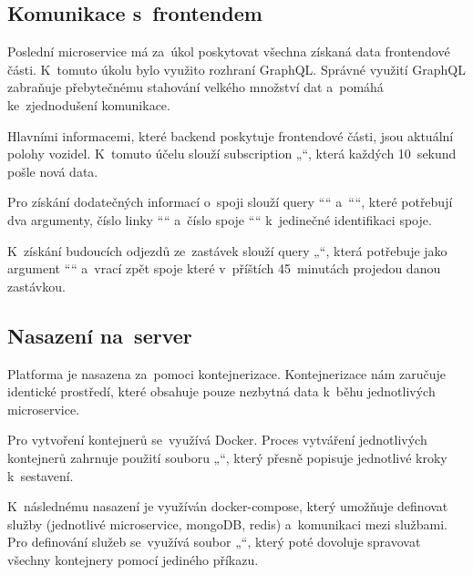 \subsection {Komunikace s~frontendem}\label{mainBackend}
Poslední microservice má za~úkol poskytovat všechna získaná data frontendové části. K~tomuto úkolu bylo využito rozhraní GraphQL. Správné využití GraphQL zabraňuje přebytečnému stahování velkého množství dat a~pomáhá ke~zjednodušení komunikace. \cite{graphqleasy} \par
Hlavními informacemi, které backend poskytuje frontendové části, jsou aktuální polohy vozidel. K~tomuto účelu slouží subscription „“, která každých 10~sekund pošle nová data.\par
Pro získání dodatečných informací o~spoji slouží query ““ \newline a~““, které potřebují dva argumenty, číslo linky ““ \newline a~číslo spoje ““ k~jedinečné identifikaci spoje.\par
K~získání budoucích odjezdů ze~zastávek slouží query „“, která potřebuje jako argument ““ a~vrací zpět spoje které v~příštích 45~minutách projedou danou zastávkou.
\subsection{Nasazení na~server}
Platforma je nasazena za~pomoci kontejnerizace. Kontejnerizace nám zaručuje identické prostředí, které obsahuje pouze nezbytná data k~běhu jednotlivých microservice.\par
Pro vytvoření kontejnerů se~využívá Docker. Proces vytváření jednotlivých kontejnerů zahrnuje použití souboru „“, který přesně popisuje jednotlivé kroky k~sestavení.\par
K~následnému nasazení je využíván docker-compose, který umožňuje definovat služby (jednotlivé microservice, mongoDB, redis) a~komunikaci mezi službami. Pro definování služeb se~využívá soubor „“, který poté dovoluje spravovat všechny kontejnery pomocí jediného příkazu.
\newpage